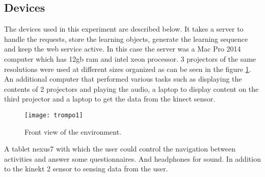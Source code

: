 \subsection{Devices}
The devices used in this experiment are described below. It takes a server to handle the requests, store the learning objects, generate the learning sequence and keep the web service active. In this case the server was a Mac Pro 2014 computer which has 12gb ram and intel xeon processor. 3 projectors of the same resolutions were used at different sizes organized as can be seen in the figure \ref{trompo1}. An additional computer that performed various tasks such as displaying the contents of 2 projectors and playing the audio, a laptop to display content on the third projector and a laptop to get the data from the kinect sensor.
\begin{figure}[ht!]  
\centering  
\texttt{[image: trompo1]}
\caption{Front view of the environment.}  
\label{trompo1}  
\end{figure}
A tablet nexus7 with which the user could control the navigation between activities and answer some questionnaires. And headphones for sound. In addition to the kinekt 2 sensor to sensing data from the user.

